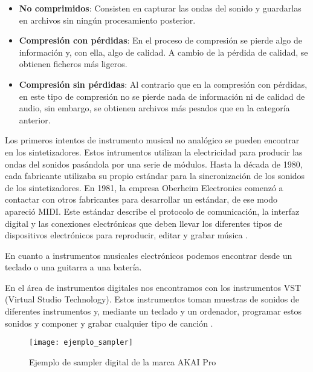         \begin{itemize}
            \item \textbf{No comprimidos}: Consisten en capturar las ondas del sonido y guardarlas en archivos sin
            ningún procesamiento posterior.
            \item \textbf{Compresión con pérdidas}: En el proceso de compresión se pierde algo de información y, con
            ella, algo de calidad. A cambio de la pérdida de calidad, se obtienen ficheros más ligeros.
            \item \textbf{Compresión sin pérdidas}: Al contrario que en la compresión con pérdidas, en este tipo de
            compresión no se pierde nada de información ni de calidad de audio, sin embargo, se obtienen archivos más
            pesados que en la categoría anterior.
        \end{itemize}

        Los primeros intentos de instrumento musical no analógico se pueden encontrar en los sintetizadores. Estos
        intrumentos utilizan la electricidad para producir las ondas del sonidos pasándola por una serie de módulos.
        Hasta la década de 1980, cada fabricante utilizaba su propio estándar para la sincronización de los sonidos de
        los sintetizadores. En 1981, la empresa Oberheim Electronics comenzó a contactar con otros fabricantes para
        desarrollar un estándar, de ese modo apareció MIDI. Este estándar describe el protocolo de comunicación, la
        interfaz digital y las conexiones electrónicas que deben llevar los diferentes tipos de dispositivos
        electrónicos para reproducir, editar y grabar música \cite{midi_wikipedia}.

        En cuanto a instrumentos musicales electrónicos podemos encontrar desde un teclado o una guitarra a una batería.

        En el área de instrumentos digitales nos encontramos con los instrumentos VST (Virtual Studio Technology). Estos
        instrumentos toman muestras de sonidos de diferentes instrumentos y, mediante un teclado y un ordenador,
        programar estos sonidos y componer y grabar cualquier tipo de canción \cite{historia_instrumentos_digitales}.

        \newpage

        \begin{figure}[ht]
            \centering
            \texttt{[image: ejemplo\_sampler]}
            \caption{Ejemplo de sampler digital de la marca AKAI Pro \cite{akai_pro_imagen}\label{fig:EjemploSampler}}
        \end{figure}

